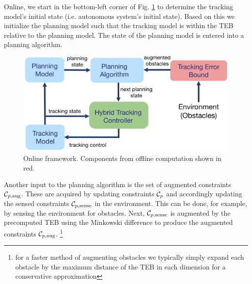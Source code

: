 Online, we start in the bottom-left corner of Fig. \ref{fig:fw_online} to determine the tracking model's initial state (i.e. autonomous system's initial state). Based on this we initialize the planning model such that the tracking model is within the TEB relative to the planning model. The state of the planning model is entered into a planning algorithm.  
\begin{figure}[h!]
	\centering
	\includegraphics[width=1\columnwidth]{fig/framework_online_2}
	\caption{Online framework. Components from offline computation shown in red.}
	\label{fig:fw_online}
\end{figure}
Another input to the planning algorithm is the set of augmented constraints $\mathcal C_{p,\text{aug}}$.  These are acquired by updating constraints $\mathcal C_p$ and accordingly updating the sensed constraints $\mathcal C_{p,\text{sense}}$ in the environment.  This can be done, for example, by sensing the environment for obstacles. Next, $\mathcal C_{p,\text{sense}}$ is augmented  by the precomputed TEB using the Minkowski difference to produce the augmented constraints $\mathcal C_{p,\text{aug}}$. \footnote{for a faster method of augmenting obstacles we typically simply expand each obstacle by the maximum distance of the TEB in each dimension for a conservative approximation}



